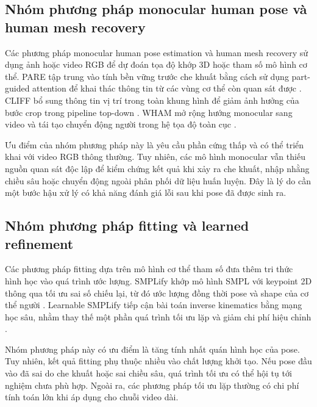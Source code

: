 \documentclass[../DoAn.tex]{subfiles}
\begin{document}
\subsection{Nhóm phương pháp monocular human pose và human mesh recovery}
Các phương pháp monocular human pose estimation và human mesh recovery sử dụng ảnh hoặc video RGB để dự đoán tọa độ khớp 3D hoặc tham số mô hình cơ thể. PARE tập trung vào tính bền vững trước che khuất bằng cách sử dụng part-guided attention để khai thác thông tin từ các vùng cơ thể còn quan sát được \cite{pare2021}. CLIFF bổ sung thông tin vị trí trong toàn khung hình để giảm ảnh hưởng của bước crop trong pipeline top-down \cite{cliff2022}. WHAM mở rộng hướng monocular sang video và tái tạo chuyển động người trong hệ tọa độ toàn cục \cite{shin2024wham}.

Ưu điểm của nhóm phương pháp này là yêu cầu phần cứng thấp và có thể triển khai với video RGB thông thường. Tuy nhiên, các mô hình monocular vẫn thiếu nguồn quan sát độc lập để kiểm chứng kết quả khi xảy ra che khuất, nhập nhằng chiều sâu hoặc chuyển động ngoài phân phối dữ liệu huấn luyện. Đây là lý do cần một bước hậu xử lý có khả năng đánh giá lỗi sau khi pose đã được sinh ra.

\subsection{Nhóm phương pháp fitting và learned refinement}
Các phương pháp fitting dựa trên mô hình cơ thể tham số đưa thêm tri thức hình học vào quá trình ước lượng. SMPLify khớp mô hình SMPL với keypoint 2D thông qua tối ưu sai số chiếu lại, từ đó ước lượng đồng thời pose và shape của cơ thể người \cite{smplify2016}. Learnable SMPLify tiếp cận bài toán inverse kinematics bằng mạng học sâu, nhằm thay thế một phần quá trình tối ưu lặp và giảm chi phí hiệu chỉnh \cite{yang2025learnable}.

Nhóm phương pháp này có ưu điểm là tăng tính nhất quán hình học của pose. Tuy nhiên, kết quả fitting phụ thuộc nhiều vào chất lượng khởi tạo. Nếu pose đầu vào đã sai do che khuất hoặc sai chiều sâu, quá trình tối ưu có thể hội tụ tới nghiệm chưa phù hợp. Ngoài ra, các phương pháp tối ưu lặp thường có chi phí tính toán lớn khi áp dụng cho chuỗi video dài.
\end{document}

